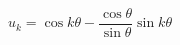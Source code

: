 \begin{displaymath}
 u_k = \cos k\theta - \frac{\cos \theta}{\sin \theta} \sin k\theta
\end{displaymath}
